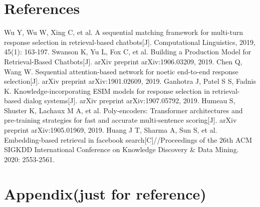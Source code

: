 \documentclass{beamer}
\begin{document}
\section{References}

\begin{frame}[allowframebreaks]
    
    \tiny

    \begin{thebibliography}{10}
     Wu Y, Wu W, Xing C, et al. A sequential matching framework for multi-turn response selection in retrieval-based chatbots[J]. Computational Linguistics, 2019, 45(1): 163-197.
     Swanson K, Yu L, Fox C, et al. Building a Production Model for Retrieval-Based Chatbots[J]. arXiv preprint arXiv:1906.03209, 2019.
     Chen Q, Wang W. Sequential attention-based network for noetic end-to-end response selection[J]. arXiv preprint arXiv:1901.02609, 2019.
     Ganhotra J, Patel S S, Fadnis K. Knowledge-incorporating ESIM models for response selection in retrieval-based dialog systems[J]. arXiv preprint arXiv:1907.05792, 2019.
     Humeau S, Shuster K, Lachaux M A, et al. Poly-encoders: Transformer architectures and pre-training strategies for fast and accurate multi-sentence scoring[J]. arXiv preprint arXiv:1905.01969, 2019.
     Huang J T, Sharma A, Sun S, et al. Embedding-based retrieval in facebook search[C]//Proceedings of the 26th ACM SIGKDD International Conference on Knowledge Discovery & Data Mining. 2020: 2553-2561.
    \end{thebibliography}
\end{frame}

\section{Appendix(just for reference)}
\end{document}
